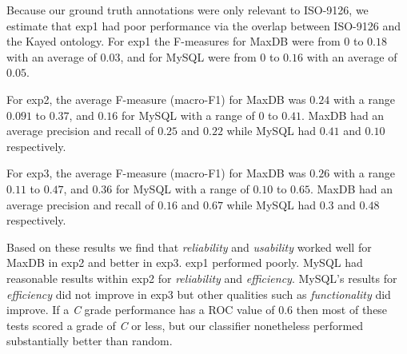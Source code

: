 \documentclass[]{sig-alternate}
\begin{document}




Because our ground truth annotations were only relevant to ISO-9126,
we estimate that \textsf{exp1} had poor
performance via the overlap between ISO-9126 and the Kayed ontology.
For \textsf{exp1} the F-measures for MaxDB were from $0$ to $0.18$ with an average
of $0.03$, and for MySQL were from $0$ to $0.16$ with an average of
$0.05$.


For \textsf{exp2}, the average F-measure (macro-F1) for MaxDB was $0.24$ with a range $0.091$ to
$0.37$, and $0.16$ for MySQL with a range of $0$ to $0.41$.
MaxDB had an average precision and recall of $0.25$ and $0.22$
while MySQL had $0.41$ and $0.10$ respectively.

For \textsf{exp3}, the average F-measure (macro-F1) for MaxDB was $0.26$ with a range $0.11$ to
$0.47$, and $0.36$ for MySQL with a range of $0.10$ to $0.65$.
MaxDB had an average precision and recall of $0.16$ and $0.67$
while MySQL had $0.3$ and $0.48$ respectively.

Based on these results we find that \emph{reliability} and
\emph{usability} worked well for MaxDB in \textsf{exp2} and better in
\textsf{exp3}. 
\textsf{exp1} performed poorly.
MySQL had reasonable results within \textsf{exp2} for \emph{reliability} and \emph{efficiency}. 
MySQL's results for \emph{efficiency} did not improve in \textsf{exp3} but other qualities such as \emph{functionality} did improve. 
If a \emph{C} grade performance has a ROC value of $0.6$ then most of these tests scored a grade of \emph{C} or less, but our classifier nonetheless performed substantially better than random.
\end{document}
